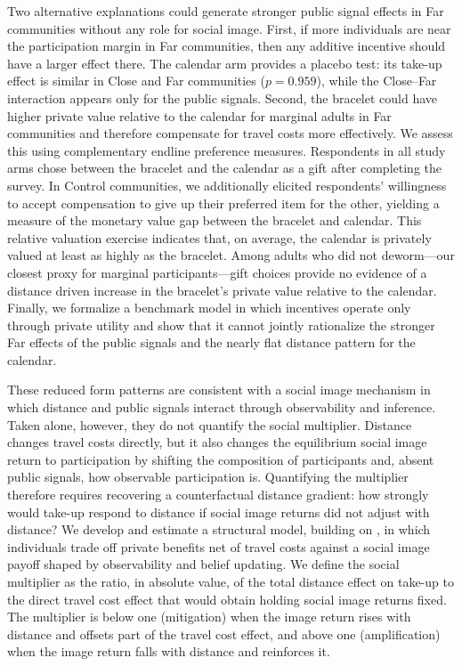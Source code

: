 \documentclass[12pt,a4paper]{article}
\begin{document}
Two alternative explanations could generate stronger public signal effects in Far communities without any role for social image. First, if more individuals are near the participation margin in Far communities, then any additive incentive should have a larger effect there. The calendar arm provides a placebo test: its take-up effect is similar in Close and Far communities (\(p=0.959\)), while the Close--Far interaction appears only for the public signals. Second, the bracelet could have higher private value relative to the calendar for marginal adults in Far communities and therefore compensate for travel costs more effectively. We assess this using complementary endline preference measures. Respondents in all study arms chose between the bracelet and the calendar as a gift after completing the survey. In Control communities, we additionally elicited respondents' willingness to accept compensation to give up their preferred item for the other, yielding a measure of the monetary value gap between the bracelet and calendar. This relative valuation exercise indicates that, on average, the calendar is privately valued at least as highly as the bracelet. Among adults who did not deworm---our closest proxy for marginal participants---gift choices provide no evidence of a distance driven increase in the bracelet's private value relative to the calendar. Finally, we formalize a benchmark model in which incentives operate only through private utility and show that it cannot jointly rationalize the stronger Far effects of the public signals and the nearly flat distance pattern for the calendar.

These reduced form patterns are consistent with a social image mechanism in which distance and public signals interact through observability and inference. Taken alone, however, they do not quantify the social multiplier. Distance changes travel costs directly, but it also changes the equilibrium social image return to participation by shifting the composition of participants and, absent public signals, how observable participation is. Quantifying the multiplier therefore requires recovering a counterfactual distance gradient: how strongly would take-up respond to distance if social image returns did not adjust with distance? We develop and estimate a structural model, building on \citet{Benabou_laws_2011}, in which individuals trade off private benefits net of travel costs against a social image payoff shaped by observability and belief updating. We define the social multiplier as the ratio, in absolute value, of the total distance effect on take-up to the direct travel cost effect that would obtain holding social image returns fixed. The multiplier is below one (mitigation) when the image return rises with distance and offsets part of the travel cost effect, and above one (amplification) when the image return falls with distance and reinforces it.
\end{document}

